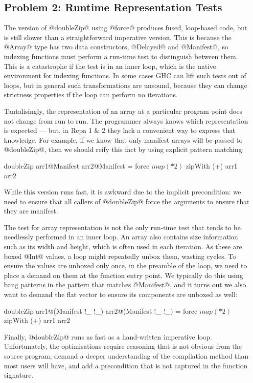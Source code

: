 \subsection{Problem 2: Runtime Representation Tests}
\label{section:rep-tests}

The version of @doubleZip@ using @force@ produces fused, loop-based code, but is still slower than a straightforward imperative version. This is because the @Array@ type has two data constructors, @Delayed@ and @Manifest@, so indexing functions must perform a run-time test to distinguish between them. This is a catastrophe if the test is in an inner loop, which is the native environment for indexing functions. In some cases GHC can lift such tests out of loops, but in general such transformations are unsound, because they can change strictness properties if the loop can perform no iterations.

Tantalisingly, the representation of an array at a particular program point does not change from run to run. The programmer always knows which representation is expected --- but, in Repa 1 \& 2 they lack a convenient way to express that knowledge. For example, if we know that only manifest arrays will be passed to @doubleZip@, then we should reify this fact by using explicit pattern matching:
\par
\begin{small}
\begin{code}
  doubleZip arr1@Manifest{} arr2@Manifest{}
   = force $ map (* 2) $ zipWith (+) arr1 arr2
\end{code}
\end{small}
%
While this version runs fast, it is awkward due to the implicit precondition: we need to ensure that all callers of @doubleZip@ force the arguments to ensure that they are manifest. 

The test for array representation is not the only run-time test that tends to be needlessly performed in an inner loop. An array also contains size information such as its width and height, which is often used in each iteration. As these are boxed @Int@ values, a loop might repeatedly unbox them, wasting cycles. To ensure the values are unboxed only once, in the preamble of the loop, we need to place a demand on them at the function entry point. We typically do this using bang patterns in the pattern that matches @Manifest@, and it turns out we also want to demand the flat vector to ensure its components are unboxed as well:
%
\begin{small}
\begin{code}
  doubleZip arr1@(Manifest !_ !_) arr2@(Manifest !_ !_)
  = force $ map (* 2) $ zipWith (+) arr1 arr2
\end{code}
\end{small}
%
Finally, @doubleZip@ runs as fast as a hand-written imperative loop. Unfortunately, the optimisations require reasoning that is not obvious from the source program, demand a deeper understanding of the compilation method than most users will have, and add a precondition that is not captured in the function signature.


